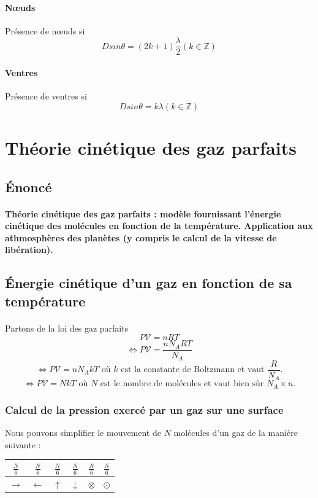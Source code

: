 \documentclass[a4paper]{article}
\begin{document}
\paragraph{Nœuds}Présence de nœuds si
\[Dsin\theta=(2k+1)\frac{\lambda}{2} (k \in \mathbb{Z})\]
\paragraph{Ventres}Présence de ventres si
\[Dsin\theta=k\lambda (k \in \mathbb{Z})\]
\section{Théorie cinétique des gaz parfaits}
\subsection{Énoncé}
\paragraph{}\textbf{Théorie cinétique des gaz parfaits : modèle fournissant l'énergie cinétique des molécules en fonction de la température. Application aux athmosphères des planètes (y compris le calcul de la vitesse de libération).}
\subsection{Énergie cinétique d'un gaz en fonction de sa température}
\paragraph{}Partons de la loi des gaz parfaits
\[P\mathscr{V}=nRT\]
\[\Leftrightarrow P\mathscr{V}=\frac{nN_ART}{N_A}\]
\[\Leftrightarrow P\mathscr{V}=nN_AkT \text{ où $k$ est la constante de Boltzmann et vaut $\frac{R}{N_A}$.}\]
\[\Leftrightarrow P\mathscr{V}=NkT \text{ où $N$ est le nombre de molécules et vaut bien sûr $N_A\times n$.}\]
\subsubsection{Calcul de la pression exercé par un gaz sur une surface}
Nous pouvons simplifier le mouvement de $N$ molécules d'un gaz de la manière suivante :
\begin{center}
\begin{tabular}{|c|c|c|c|c|c|}
\hline
$\frac{N}{6}$ & $\frac{N}{6}$ & $\frac{N}{6}$ & $\frac{N}{6}$ & $\frac{N}{6}$ & $\frac{N}{6}$ \\
\hline
$\rightarrow$ & $\leftarrow$ & $\uparrow$ & $\downarrow$ & $\otimes$ & $\odot$ \\
\hline
\end{tabular}
\end{center}
\end{document}
